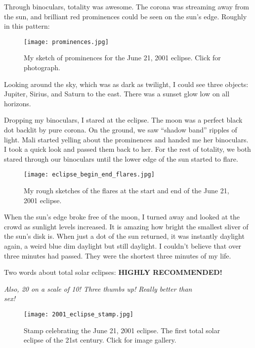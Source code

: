 Through binoculars, totality was awesome. The corona was streaming away
from the sun, and brilliant red prominences could be seen on the sun's
edge. Roughly in this pattern:

\begin{figure}
\centering
\texttt{[image: prominences.jpg]}
\caption{My sketch of prominences for the June 21, 2001 eclipse. Click
for photograph.}
\end{figure}

Looking around the sky, which was as dark as twilight, I could see three
objects: Jupiter, Sirius, and Saturn to the east. There was a sunset
glow low on all horizons.

Dropping my binoculars, I stared at the eclipse. The moon was a perfect
black dot backlit by pure corona. On the ground, we saw ``shadow band''
ripples of light. Mali started yelling about the prominences and handed
me her binoculars. I took a quick look and passed them back to her. For
the rest of totality, we both stared through our binoculars until the
lower edge of the sun started to flare.

\begin{figure}
\centering
\texttt{[image: eclipse\_begin\_end\_flares.jpg]}
\caption{My rough sketches of the flares at the start and end of the
June 21, 2001 eclipse.}
\end{figure}

When the sun's edge broke free of the moon, I turned away and looked at
the crowd as sunlight levels increased. It is amazing how bright the
smallest sliver of the sun's disk is. When just a dot of the sun
returned, it was instantly daylight again, a weird blue dim daylight but
still daylight. I couldn't believe that over three minutes had passed.
They were the shortest three minutes of my life.

Two words about total solar eclipses: \textbf{HIGHLY RECOMMENDED!}

\emph{Also, 20 on a scale of 10! Three thumbs up! Really better than\\
sex!}

\begin{figure}
\centering
\texttt{[image: 2001\_eclipse\_stamp.jpg]}
\caption{Stamp celebrating the June 21, 2001 eclipse. The first total
solar eclipse of the 21st century. Click for image gallery.}
\end{figure}


